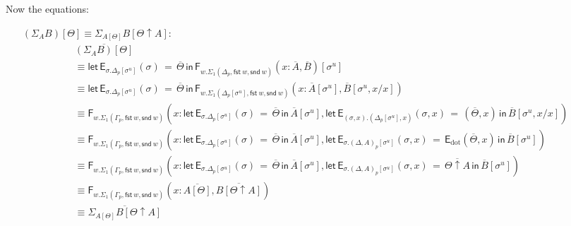 \documentclass[10pt]{article}
\theoremstyle{definition}
\newcommand\dsd[1]{\ensuremath{\mathsf{#1}}}
\newcommand{\app}[2]{\ensuremath{#1 \: #2}}
\newcommand{\fst}[1]{\app{\dsd{fst}}{#1}}
\newcommand{\snd}[1]{\app{\dsd{snd}}{#1}}
\newcommand\F[2]{\ensuremath{\mathsf{F}_{#1}(#2)}}
\newcommand\EEs[4]{\ensuremath{\mathsf{let} \, \mathsf{E}_{#1}(#3) \, = \, {#2} \, \mathsf{in} \, #4}}
\newcommand\EIs[2]{\ensuremath{\mathsf{E}_{#1}{(#2)}}}
\newcommand\unp[2]{\ensuremath{{#2}^u}}
\newcommand{\modeof}[1]{{#1}_p}
\newcommand{\sdot}{\ensuremath{\mathrm{dot}}}
\newcommand{\upstairs}[1]{\overline{#1}}
\begin{document}
Now the equations:
\begin{enumerate}[style = multiline, labelwidth = 80pt]
\item[{$(\Sigma_A B)[\Theta] \equiv \Sigma_{A[\Theta]} B[\Theta \uparrow A]$}:] 
\begin{align*}
&\upstairs{(\Sigma_A B)[\Theta]} \\
&\equiv \EEs{\sigma.\modeof{\Delta}[\unp{\Delta}{\sigma}]}{\upstairs{\Theta}}{\sigma}{\F{w. \Sigma_1(\modeof{\Delta},\fst w, \snd w)}{x : \upstairs{A}, \upstairs{B}}[\unp{\Delta}{\sigma}]} \\
&\equiv \EEs{\sigma.\modeof{\Delta}[\unp{\Delta}{\sigma}]}{\upstairs{\Theta}}{\sigma}{\F{w. \Sigma_1(\modeof{\Delta}[\unp{\Delta}{\sigma}],\fst w, \snd w)}{x : \upstairs{A}[\unp{\Delta}{\sigma}], \upstairs{B}[\unp{\Delta}{\sigma}, x / x] }} \\
&\equiv \F{w. \Sigma_1(\modeof{\Gamma},\fst w, \snd w)}{x : \EEs{\sigma.\modeof{\Delta}[\unp{\Delta}{\sigma}]}{\upstairs{\Theta}}{\sigma}{\upstairs{A}[\unp{\Delta}{\sigma}]}, \EEs{(\sigma, x). (\modeof{\Delta}[\unp{\Delta}{\sigma}], x)}{(\upstairs{\Theta},x)}{\sigma, x}{\upstairs{B}[\unp{\Delta}{\sigma}, x/x]} } \\
&\equiv \F{w. \Sigma_1(\modeof{\Gamma},\fst w, \snd w)}{x : \EEs{\sigma.\modeof{\Delta}[\unp{\Delta}{\sigma}]}{\upstairs{\Theta}}{\sigma}{\upstairs{A}[\unp{\Delta}{\sigma}]}, \EEs{\sigma.\modeof{(\Delta,A)}[\unp{\Delta,A}{\sigma}]}{\EIs{\sdot}{\upstairs{\Theta},x}}{\sigma, x}{\upstairs{B}[\unp{\Delta, A}{\sigma}]} } \\
&\equiv \F{w. \Sigma_1(\modeof{\Gamma},\fst w, \snd w)}{x : \EEs{\sigma.\modeof{\Delta}[\unp{\Delta}{\sigma}]}{\upstairs{\Theta}}{\sigma}{\upstairs{A}[\unp{\Delta}{\sigma}]}, \EEs{\sigma.\modeof{(\Delta,A)}[\unp{\Delta,A}{\sigma}]}{\upstairs{\Theta \uparrow A}}{\sigma, x}{\upstairs{B}[\unp{\Delta, A}{\sigma}]} } \\
&\equiv \F{w. \Sigma_1(\modeof{\Gamma},\fst w, \snd w)}{x : \upstairs{A[\Theta]}, \upstairs{B[\Theta \uparrow A]}} \\
&\equiv \upstairs{\Sigma_{A[\Theta]} B[\Theta \uparrow A]}
\end{align*}


\end{enumerate}
\end{document}
